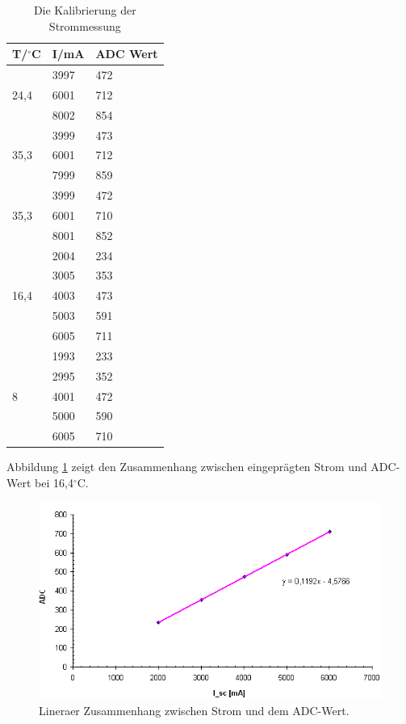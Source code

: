 \documentclass[a4paper,bibtotoc,oneside]{scrbook}
\begin{document}
\begin{table}[htbp]
\centering
\begin{tabular}{|l|l|l|}
\hline
T/$^{\circ}$C & I/mA & ADC Wert \\ 
\hline
\hline

\multirow{3}{*}{24,4} & 3997 & 472 \\
 & 6001 & 712 \\
 & 8002 & 854 \\ \hline
\multirow{3}{*}{35,3} & 3999 & 473 \\
 & 6001 & 712 \\
 & 7999 & 859 \\ \hline
\multirow{3}{*}{35,3} & 3999 & 472 \\
 & 6001 & 710 \\
 & 8001 & 852 \\ \hline
\multirow{5}{*}{16,4} & 2004 & 234 \\
 & 3005 & 353 \\
 & 4003 & 473 \\
 & 5003 & 591 \\
 & 6005 & 711 \\ \hline
\multirow{5}{*}{8} & 1993 & 233 \\
 & 2995 & 352 \\
 & 4001 & 472 \\
 & 5000 & 590 \\
 & 6005 & 710 \\ \hline
\end{tabular}
\caption{Die Kalibrierung der Strommessung}\label{TabS}
\end{table}

\noindent Abbildung \ref{ical} zeigt den Zusammenhang zwischen eingeprägten Strom und ADC-Wert bei 16,4$^{\circ}$C. 

\begin{figure}[htbp]
\centering
\includegraphics[width=150mm]{img/16grad.png}
\caption{Lineraer Zusammenhang zwischen Strom und dem ADC-Wert.}\label{ical}
\end{figure}
\end{document}
